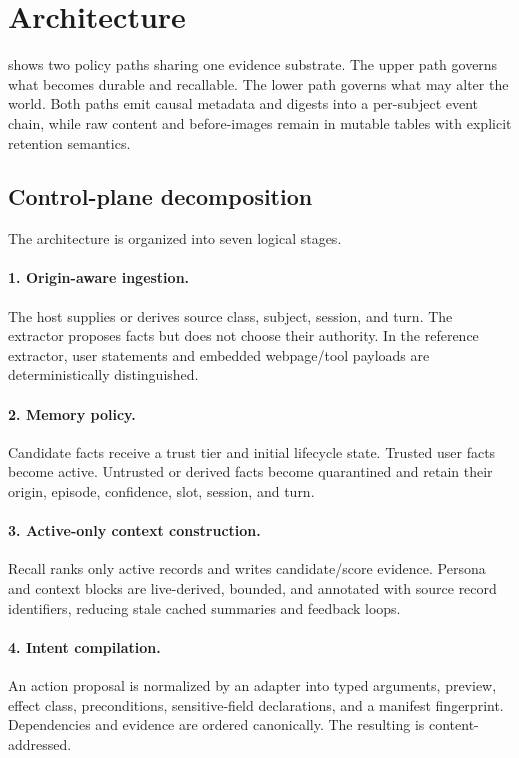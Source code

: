 \section{Architecture}



 shows two policy paths sharing one evidence substrate. The upper path governs what becomes durable and recallable. The lower path governs what may alter the world. Both paths emit causal metadata and digests into a per-subject event chain, while raw content and before-images remain in mutable tables with explicit retention semantics.

\subsection{Control-plane decomposition}

The architecture is organized into seven logical stages.

\paragraph{1. Origin-aware ingestion.} The host supplies or derives source class, subject, session, and turn. The extractor proposes facts but does not choose their authority. In the reference extractor, user statements and embedded webpage/tool payloads are deterministically distinguished.

\paragraph{2. Memory policy.} Candidate facts receive a trust tier and initial lifecycle state. Trusted user facts become active. Untrusted or derived facts become quarantined and retain their origin, episode, confidence, slot, session, and turn.

\paragraph{3. Active-only context construction.} Recall ranks only active records and writes candidate/score evidence. Persona and context blocks are live-derived, bounded, and annotated with source record identifiers, reducing stale cached summaries and feedback loops.

\paragraph{4. Intent compilation.} An action proposal is normalized by an adapter into typed arguments, preview, effect class, preconditions, sensitive-field declarations, and a manifest fingerprint. Dependencies and evidence are ordered canonically. The resulting \worldpatch{} is content-addressed.

